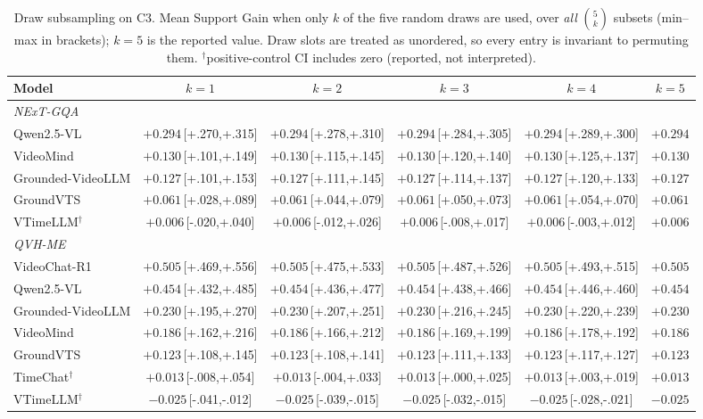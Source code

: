 \begin{table}[t]
\centering
\scriptsize
\setlength{\tabcolsep}{3pt}
\caption{Draw subsampling on C3. Mean Support Gain when only $k$ of the five random draws are used, over \emph{all} $\binom{5}{k}$ subsets (min--max in brackets); $k{=}5$ is the reported value. Draw slots are treated as unordered, so every entry is invariant to permuting them. $^{\dagger}$positive-control CI includes zero (reported, not interpreted).}
\label{tab:a3_draw_subsampling}
\begin{tabular}{l ccccc}
\toprule
Model & $k{=}1$ & $k{=}2$ & $k{=}3$ & $k{=}4$ & $k{=}5$ \\
\midrule
\multicolumn{6}{l}{\textit{NExT-GQA}} \\
Qwen2.5-VL & $+0.294$\,\tiny[+.270,+.315] & $+0.294$\,\tiny[+.278,+.310] & $+0.294$\,\tiny[+.284,+.305] & $+0.294$\,\tiny[+.289,+.300] & $+0.294$ \\
VideoMind & $+0.130$\,\tiny[+.101,+.149] & $+0.130$\,\tiny[+.115,+.145] & $+0.130$\,\tiny[+.120,+.140] & $+0.130$\,\tiny[+.125,+.137] & $+0.130$ \\
Grounded-VideoLLM & $+0.127$\,\tiny[+.101,+.153] & $+0.127$\,\tiny[+.111,+.145] & $+0.127$\,\tiny[+.114,+.137] & $+0.127$\,\tiny[+.120,+.133] & $+0.127$ \\
GroundVTS & $+0.061$\,\tiny[+.028,+.089] & $+0.061$\,\tiny[+.044,+.079] & $+0.061$\,\tiny[+.050,+.073] & $+0.061$\,\tiny[+.054,+.070] & $+0.061$ \\
VTimeLLM$^{\dagger}$ & $+0.006$\,\tiny[-.020,+.040] & $+0.006$\,\tiny[-.012,+.026] & $+0.006$\,\tiny[-.008,+.017] & $+0.006$\,\tiny[-.003,+.012] & $+0.006$ \\
\midrule
\multicolumn{6}{l}{\textit{QVH-ME}} \\
VideoChat-R1 & $+0.505$\,\tiny[+.469,+.556] & $+0.505$\,\tiny[+.475,+.533] & $+0.505$\,\tiny[+.487,+.526] & $+0.505$\,\tiny[+.493,+.515] & $+0.505$ \\
Qwen2.5-VL & $+0.454$\,\tiny[+.432,+.485] & $+0.454$\,\tiny[+.436,+.477] & $+0.454$\,\tiny[+.438,+.466] & $+0.454$\,\tiny[+.446,+.460] & $+0.454$ \\
Grounded-VideoLLM & $+0.230$\,\tiny[+.195,+.270] & $+0.230$\,\tiny[+.207,+.251] & $+0.230$\,\tiny[+.216,+.245] & $+0.230$\,\tiny[+.220,+.239] & $+0.230$ \\
VideoMind & $+0.186$\,\tiny[+.162,+.216] & $+0.186$\,\tiny[+.166,+.212] & $+0.186$\,\tiny[+.169,+.199] & $+0.186$\,\tiny[+.178,+.192] & $+0.186$ \\
GroundVTS & $+0.123$\,\tiny[+.108,+.145] & $+0.123$\,\tiny[+.108,+.141] & $+0.123$\,\tiny[+.111,+.133] & $+0.123$\,\tiny[+.117,+.127] & $+0.123$ \\
TimeChat$^{\dagger}$ & $+0.013$\,\tiny[-.008,+.054] & $+0.013$\,\tiny[-.004,+.033] & $+0.013$\,\tiny[+.000,+.025] & $+0.013$\,\tiny[+.003,+.019] & $+0.013$ \\
VTimeLLM$^{\dagger}$ & $-0.025$\,\tiny[-.041,-.012] & $-0.025$\,\tiny[-.039,-.015] & $-0.025$\,\tiny[-.032,-.015] & $-0.025$\,\tiny[-.028,-.021] & $-0.025$ \\
\bottomrule
\end{tabular}
\end{table}

